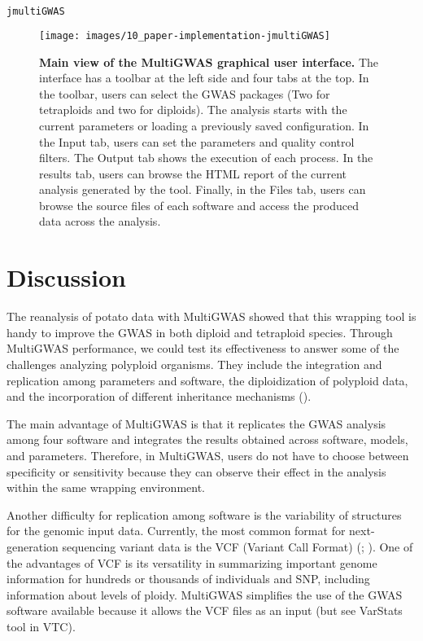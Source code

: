 \documentclass{article}
\begin{document}
\begin{lstlisting}[language=bash,basicstyle={\small}]
jmultiGWAS
\end{lstlisting}

\begin{figure}[H]
\begin{centering}
\texttt{[image: images/10\_paper-implementation-jmultiGWAS]}
\par\end{centering}
\caption{\textbf{Main view of the MultiGWAS graphical user interface.}  The interface has a toolbar at the left side and four tabs at the top. In the toolbar, users can select the GWAS packages (Two for tetraploids and two for diploids). The analysis starts with the current parameters or loading a previously saved configuration. In the Input tab, users can set the parameters and quality control filters. The Output tab shows the execution of each process. In the results tab, users can browse the HTML report of the current analysis generated by the tool. Finally, in the Files tab, users can browse the source files of each software and access the produced data across the analysis.}\label{fig:MultiGWAS-interaction} 
\end{figure}

\section{Discussion}

The reanalysis of potato data with MultiGWAS showed that this wrapping tool is handy to improve the GWAS in both diploid and tetraploid species. Through MultiGWAS performance, we could test its effectiveness to answer some of the challenges analyzing polyploid organisms. They include the integration and replication among parameters and software, the diploidization of polyploid data, and the incorporation of different inheritance mechanisms (\cite{dufresne2014}). 

The main advantage of MultiGWAS is that it replicates the GWAS analysis among four software and integrates the results obtained across software, models, and parameters. Therefore, in MultiGWAS, users do not have to choose between specificity or sensitivity because they can observe their effect in the analysis within the same wrapping environment.  

Another difficulty for replication among software is the variability of structures for the genomic input data. Currently, the most common format for next-generation sequencing variant data is the VCF (Variant Call Format) (\cite{Danecek2011}; \cite{Ebbert2014}). One of the advantages of VCF is its versatility in summarizing important genome information for hundreds or thousands of individuals and SNP, including information about levels of ploidy. MultiGWAS simplifies the use of the GWAS software available because it allows the VCF files as an input (but see VarStats tool in VTC).  
\end{document}

